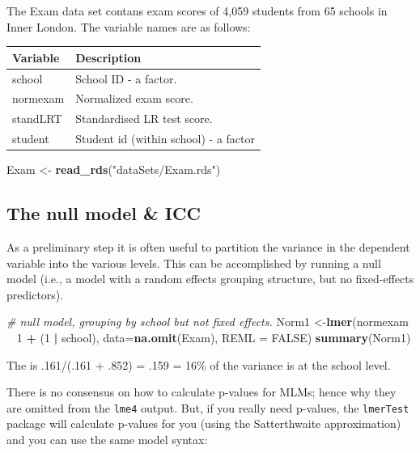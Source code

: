 \documentclass[]{book}
\newenvironment{Shaded}{\begin{snugshade}}{\end{snugshade}}
\newcommand{\KeywordTok}[1]{\textcolor[rgb]{0.13,0.29,0.53}{\textbf{#1}}}
\newcommand{\DataTypeTok}[1]{\textcolor[rgb]{0.13,0.29,0.53}{#1}}
\newcommand{\DecValTok}[1]{\textcolor[rgb]{0.00,0.00,0.81}{#1}}
\newcommand{\StringTok}[1]{\textcolor[rgb]{0.31,0.60,0.02}{#1}}
\newcommand{\CommentTok}[1]{\textcolor[rgb]{0.56,0.35,0.01}{\textit{#1}}}
\newcommand{\OtherTok}[1]{\textcolor[rgb]{0.56,0.35,0.01}{#1}}
\newcommand{\OperatorTok}[1]{\textcolor[rgb]{0.81,0.36,0.00}{\textbf{#1}}}
\newcommand{\NormalTok}[1]{#1}
\begin{document}
The Exam data set contans exam scores of 4,059 students from 65 schools
in Inner London. The variable names are as follows:

\begin{longtable}[]{@{}ll@{}}
\toprule
Variable & Description\tabularnewline
\midrule
\endhead
school & School ID - a factor.\tabularnewline
normexam & Normalized exam score.\tabularnewline
standLRT & Standardised LR test score.\tabularnewline
student & Student id (within school) - a factor\tabularnewline
\bottomrule
\end{longtable}

\begin{Shaded}
\begin{Highlighting}[]
\NormalTok{  Exam <-}\StringTok{ }\KeywordTok{read_rds}\NormalTok{(}\StringTok{"dataSets/Exam.rds"}\NormalTok{)}
\end{Highlighting}
\end{Shaded}

\subsection{The null model \& ICC}\label{the-null-model-icc}

As a preliminary step it is often useful to partition the variance in
the dependent variable into the various levels. This can be accomplished
by running a null model (i.e., a model with a random effects grouping
structure, but no fixed-effects predictors).

\begin{Shaded}
\begin{Highlighting}[]
  \CommentTok{# null model, grouping by school but not fixed effects.}
\NormalTok{  Norm1 <-}\KeywordTok{lmer}\NormalTok{(normexam }\OperatorTok{~}\StringTok{ }\DecValTok{1} \OperatorTok{+}\StringTok{ }\NormalTok{(}\DecValTok{1} \OperatorTok{|}\StringTok{ }\NormalTok{school),}
                \DataTypeTok{data=}\KeywordTok{na.omit}\NormalTok{(Exam), }\DataTypeTok{REML =} \OtherTok{FALSE}\NormalTok{)}
  \KeywordTok{summary}\NormalTok{(Norm1)}
\end{Highlighting}
\end{Shaded}

The is .161/(.161 + .852) = .159 = 16\% of the variance is at the school
level.

There is no consensus on how to calculate p-values for MLMs; hence why
they are omitted from the \texttt{lme4} output. But, if you really need
p-values, the \texttt{lmerTest} package will calculate p-values for you
(using the Satterthwaite approximation) and you can use the same model
syntax:
\end{document}
